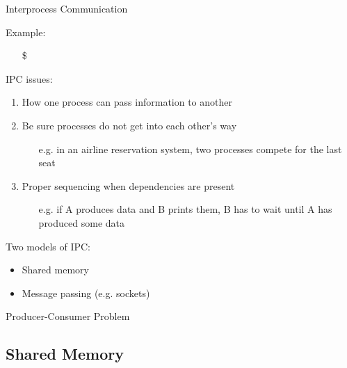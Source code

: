 \begin{frame}{Interprocess Communication}
  \begin{block}{Example:}
    \begin{itemize}
    \item[\$] 
    \end{itemize}
  \end{block}
  \begin{block}{IPC issues:}
    \begin{enumerate}
    \item How one process can pass information to another
    \item Be sure processes do not get into each other's way
      \begin{itemize}
      \item[e.g.] in an airline reservation system, two processes compete for the last
        seat
      \end{itemize}
    \item Proper sequencing when dependencies are present
      \begin{itemize}
      \item[e.g.] if A produces data and B prints them, B has to wait until A has produced
        some data
      \end{itemize}
    \end{enumerate}
  \end{block}
  \begin{block}{Two models of IPC:}
    \begin{itemize}
    \item Shared memory
    \item Message passing (e.g. sockets)
    \end{itemize}
  \end{block}
\end{frame}

\begin{frame}{Producer-Consumer Problem}
  \centering
  \mode<beamer>{ \texttt{[image: ipc]} }
\end{frame}

\subsection{Shared Memory}
\label{sec:shared-memory}

